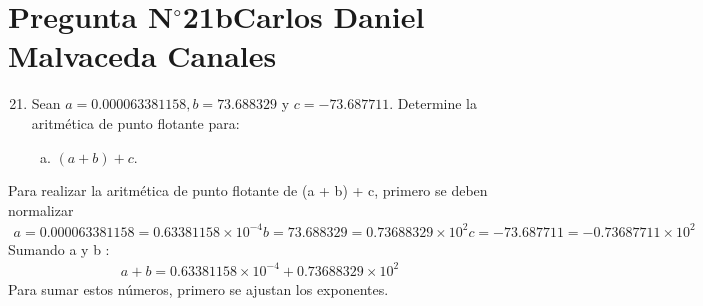 \section{Pregunta N$^{\circ}$21b\qquad Carlos Daniel Malvaceda Canales}

\begin{frame}
	\begin{enumerate}\setcounter{enumi}{20}
		\item

		      Sean $a=0.000063381158, b=73.688329$ y $c=-73.687711$.
		      Determine la aritmética de punto flotante para:

		      \begin{enumerate}[b)]
			      \item

			            \begin{math}
				            \left(a+b\right)+c
			            \end{math}.
		      \end{enumerate}
	\end{enumerate}

    \begin{solution}
        Para realizar la aritmética de punto flotante de (a + b) + c, primero se deben normalizar 
        \begin{align*}
            a = 0.000063381158 = 0.63381158 \times 10^{-4}
            b = 73.688329 = 0.73688329 \times 10^{2} 
            c = -73.687711 = -0.73687711 \times 10^{2}
        \end{align*}
        Sumando a y b :
        \begin{align*}
            a + b = 0.63381158 \times 10^{-4} +  0.73688329 \times 10^{2}
        \end{align*} 
        Para sumar estos números, primero se ajustan los exponentes.
        \begin{math}
        
        \end{math}
    \end{solution}
        

\end{frame}
